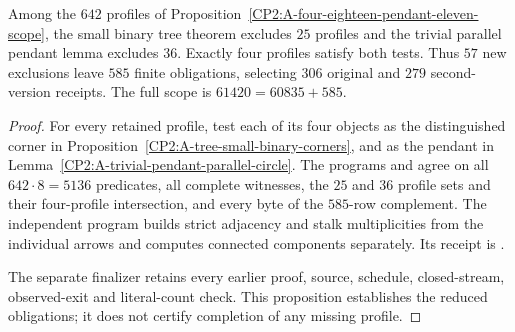 \begin{proposition}
\label{CP2:A-four-eighteen-tree-binary-scope}
Among the $642$ profiles of
Proposition~\ref{CP2:A-four-eighteen-pendant-eleven-scope},
the small binary tree theorem excludes $25$ profiles
and the trivial parallel pendant lemma excludes $36$.
Exactly four profiles satisfy both tests. Thus $57$
new exclusions leave $585$ finite obligations, selecting
$306$ original and $279$ second-version receipts.
The full scope is $61420=60835+585$.
\end{proposition}
\begin{proof}
For every retained profile, test each of its four
objects as the distinguished corner in
Proposition~\ref{CP2:A-tree-small-binary-corners}, and
as the pendant in
Lemma~\ref{CP2:A-trivial-pendant-parallel-circle}.
The programs
and
agree on all $642\cdot8=5136$ predicates, all complete
witnesses, the $25$ and $36$ profile sets and their
four-profile intersection, and every byte of the
$585$-row complement. The independent program builds
strict adjacency and stalk multiplicities from the
individual arrows and computes connected components
separately. Its receipt is
.

The separate finalizer
retains every earlier proof, source, schedule,
closed-stream, observed-exit and literal-count check.
This proposition establishes the reduced obligations;
it does not certify completion of any missing profile.
\end{proof}
